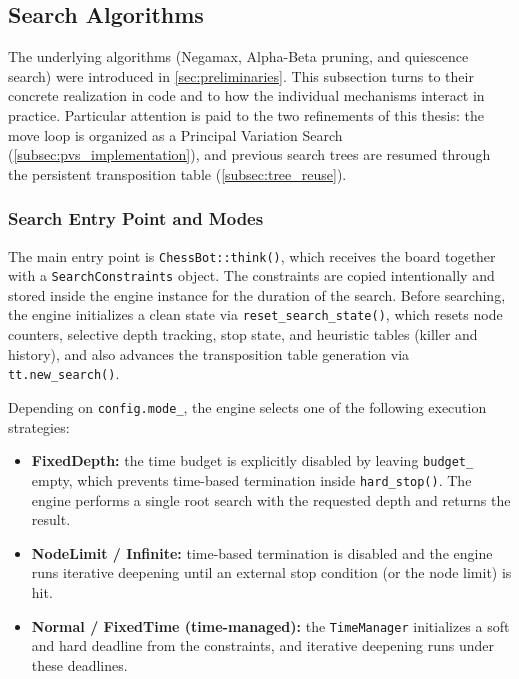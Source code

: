 \subsection{Search Algorithms}
\label{sec:search}

The underlying algorithms (Negamax, Alpha-Beta pruning, and quiescence search)
were introduced in \cref{sec:preliminaries}. This subsection turns to their
concrete realization in code and to how the individual mechanisms interact in
practice. Particular attention is paid to the two refinements of
this thesis: the move loop is organized as a Principal Variation Search
(\cref{subsec:pvs_implementation}), and previous search trees are resumed
through the persistent transposition table (\cref{subsec:tree_reuse}).

\subsubsection{Search Entry Point and Modes}

The main entry point is \texttt{ChessBot::think()}, which receives the board
together with a \texttt{SearchConstraints} object. The constraints are copied
intentionally and stored inside the engine instance for the duration of the
search. Before searching, the engine
initializes a clean state via \texttt{reset\_search\_state()}, which resets node
counters, selective depth tracking, stop state, and heuristic tables (killer and
history), and also advances the transposition table generation via
\texttt{tt.new\_search()}.

Depending on \texttt{config.mode\_}, the engine selects one of the following
execution strategies:
\begin{itemize}
    \item \textbf{FixedDepth:} the time budget is explicitly disabled by leaving
    \texttt{budget\_} empty, which prevents time-based termination inside
    \texttt{hard\_stop()}. The engine performs a single root search with the
    requested depth and returns the result.
    \item \textbf{NodeLimit / Infinite:} time-based termination is disabled and
    the engine runs iterative deepening until an external stop condition
    (or the node limit) is hit.
    \item \textbf{Normal / FixedTime (time-managed):} the \texttt{TimeManager}
    initializes a soft and hard deadline from the constraints, and iterative
    deepening runs under these deadlines.
\end{itemize}


